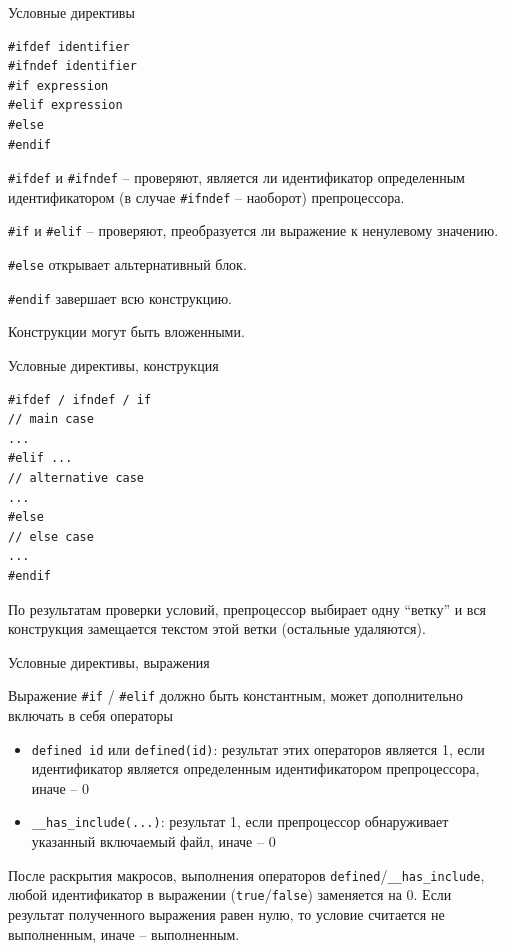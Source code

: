 \documentclass[unknownkeysallowed,xcolor=table]{beamer}
\begin{document}
\begin{frame}[fragile]{Условные директивы}

\begin{lstlisting}
#ifdef identifier
#ifndef identifier
#if expression
#elif expression
#else
#endif
\end{lstlisting}

\vspace{0.5em}

\lstinline{#ifdef} и \lstinline{#ifndef} -- проверяют, является ли идентификатор определенным идентификатором (в случае \lstinline{#ifndef} -- наоборот) препроцессора.

\lstinline{#if} и \lstinline{#elif} -- проверяют, преобразуется ли выражение к ненулевому значению.

\lstinline{#else} открывает альтернативный блок.

\lstinline{#endif} завершает всю конструкцию.

\vspace{0.5em}

Конструкции могут быть вложенными.

\end{frame}

\begin{frame}[fragile]{Условные директивы, конструкция}

\begin{lstlisting}
#ifdef / ifndef / if
// main case
...
#elif ...
// alternative case
...
#else
// else case
...
#endif
\end{lstlisting}

\vspace{1em}

По результатам проверки условий, препроцессор выбирает одну ``ветку'' и вся конструкция замещается текстом этой ветки (остальные удаляются).

\end{frame}

\begin{frame}[fragile]{Условные директивы, выражения}

Выражение \lstinline{#if} / \lstinline{#elif} должно быть константным, может дополнительно включать в себя операторы

\begin{itemize}
  \item \lstinline{defined id} или \lstinline{defined(id)}: результат этих операторов является 1, если идентификатор является определенным идентификатором препроцессора, иначе -- 0
  \item \lstinline{__has_include(...)}: результат 1, если препроцессор обнаруживает указанный включаемый файл, иначе -- 0
\end{itemize}

После раскрытия макросов, выполнения операторов \lstinline{defined}/\lstinline{__has_include}, любой идентификатор в выражении (\lstinline{true}/\lstinline{false}) заменяется на 0. Если результат полученного выражения равен нулю, то условие считается не выполненным, иначе -- выполненным.

\end{frame}
\end{document}
